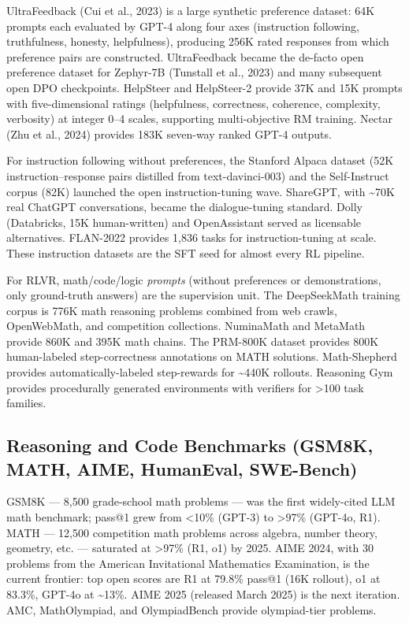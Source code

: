 \documentclass{article}
\begin{document}
UltraFeedback (Cui et al., 2023) is a large synthetic preference dataset: 64K prompts each evaluated by GPT-4 along four axes (instruction following, truthfulness, honesty, helpfulness), producing 256K rated responses from which preference pairs are constructed. UltraFeedback became the de-facto open preference dataset for Zephyr-7B (Tunstall et al., 2023) and many subsequent open DPO checkpoints. HelpSteer \citep{wang2024interpretableprefe} and HelpSteer-2 provide 37K and 15K prompts with five-dimensional ratings (helpfulness, correctness, coherence, complexity, verbosity) at integer 0--4 scales, supporting multi-objective RM training. Nectar (Zhu et al., 2024) provides 183K seven-way ranked GPT-4 outputs.

For instruction following without preferences, the Stanford Alpaca dataset (52K instruction--response pairs distilled from text-davinci-003) and the Self-Instruct corpus (82K) launched the open instruction-tuning wave. ShareGPT, with \textasciitilde70K real ChatGPT conversations, became the dialogue-tuning standard. Dolly (Databricks, 15K human-written) and OpenAssistant served as licensable alternatives. FLAN-2022 \citep{chung20222022} provides 1,836 tasks for instruction-tuning at scale. These instruction datasets are the SFT seed for almost every RL pipeline.

For RLVR, math/code/logic \emph{prompts} (without preferences or demonstrations, only ground-truth answers) are the supervision unit. The DeepSeekMath training corpus is 776K math reasoning problems combined from web crawls, OpenWebMath, and competition collections. NuminaMath and MetaMath provide 860K and 395K math chains. The PRM-800K dataset \citep{lightman2023letsverifystepbyst} provides 800K human-labeled step-correctness annotations on MATH solutions. Math-Shepherd \citep{wang2024interpretableprefe} provides automatically-labeled step-rewards for \textasciitilde440K rollouts. Reasoning Gym \citep{stojanovski20252025} provides procedurally generated environments with verifiers for \textgreater100 task families.

\subsection{Reasoning and Code Benchmarks (GSM8K, MATH, AIME, HumanEval, SWE-Bench)}\label{reasoning-and-code-benchmarks-gsm8k-math-aime-humaneval-swe-bench}

GSM8K \citep{cobbe20212021} --- 8,500 grade-school math problems --- was the first widely-cited LLM math benchmark; pass@1 grew from \textless10\% (GPT-3) to \textgreater97\% (GPT-4o, R1). MATH \citep{hendrycks2021measuringmathemati} --- 12,500 competition math problems across algebra, number theory, geometry, etc. --- saturated at \textgreater97\% (R1, o1) by 2025. AIME 2024, with 30 problems from the American Invitational Mathematics Examination, is the current frontier: top open scores are R1 at 79.8\% pass@1 (16K rollout), o1 at 83.3\%, GPT-4o at \textasciitilde13\%. AIME 2025 (released March 2025) is the next iteration. AMC, MathOlympiad, and OlympiadBench provide olympiad-tier problems.
\end{document}
